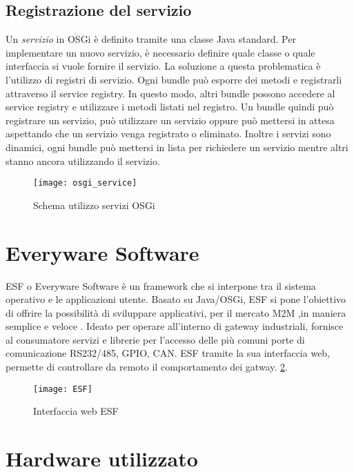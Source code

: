 \subsection{Registrazione del servizio}
Un \emph{servizio} in OSGi è definito tramite una classe Java standard. Per
implementare un nuovo servizio, è necessario definire quale classe o quale
interfaccia si vuole fornire il servizio.
La soluzione a questa problematica è l'utilizzo di registri di servizio. Ogni bundle può
esporre dei metodi e registrarli attraverso il service registry. In questo
modo, altri bundle possono accedere al service registry e utilizzare i metodi
listati nel registro. Un bundle quindi può registrare un servizio, può
utilizzare un servizio oppure può mettersi in attesa aspettando che un servizio
venga registrato o eliminato.
Inoltre i servizi sono dinamici, ogni bundle può mettersi in lista per
richiedere un servizio mentre altri stanno ancora utilizzando il servizio.
\begin{figure}[th]
        \centering 
                \texttt{[image: osgi\_service]}
        \caption{Schema utilizzo servizi OSGi}
        \label{}
\end{figure}

\section{Everyware Software}
ESF o Everyware Software è un framework che si interpone tra il sistema operativo
e le applicazioni utente. Basato su Java/OSGi, ESF si pone l'obiettivo di
offrire  la possibilità di sviluppare applicativi, per il mercato M2M ,in maniera semplice e veloce
. Ideato per operare all'interno di gateway
industriali, fornisce al consumatore servizi e librerie per l'accesso delle più
comuni porte di comunicazione RS232/485, GPIO, CAN.
ESF tramite la sua interfaccia web, permette di controllare da remoto il
comportamento dei gatway.
\ref{fig:ESF_web}.


\begin{figure}[th]
        \centering 
                \texttt{[image: ESF]}
                \caption{Interfaccia web ESF}
        \label{fig:ESF_web}
\end{figure}

\section{Hardware utilizzato}

